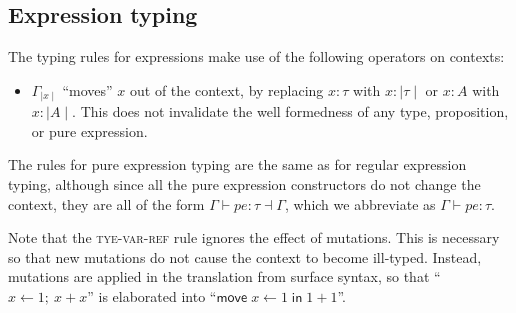\documentclass[acmsmall,nonacm]{acmart}
\newcommand{\core}[1]{{\mid}#1{\mid}}
\newcommand{\makes}{\dashv}
\begin{document}
\subsection{Expression typing}

The typing rules for expressions make use of the following operators on contexts:

\begin{itemize}
  \item $\Gamma_{\core x}$ ``moves'' $x$ out of the context, by replacing $x:\tau$ with $x:\core\tau$ or $x:A$ with $x:\core A$. This does not invalidate the well formedness of any type, proposition, or pure expression.
\end{itemize}

The rules for pure expression typing are the same as for regular expression typing, although since all the pure expression constructors do not change the context, they are all of the form $\Gamma\vdash pe:\tau\makes \Gamma$, which we abbreviate as $\Gamma\vdash pe:\tau$.

Note that the \textsc{tye-var-ref} rule ignores the effect of mutations. This is necessary so that new mutations do not cause the context to become ill-typed. Instead, mutations are applied in the translation from surface syntax, so that ``$x\gets 1;\ x+x$'' is elaborated into ``$\mathsf{move}\;x\gets 1\;\mathsf{in}\;1+1$''.
\end{document}
